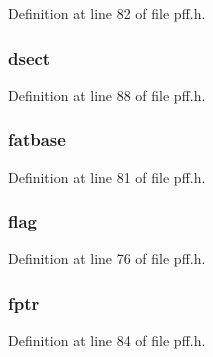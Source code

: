 Definition at line 82 of file pff.\-h.

\hypertarget{struct___f_a_t_f_s___a00baf8b1489c56d34413c3a628cdb9e6}{
\subsubsection[{dsect}]{ dsect}}\label{struct___f_a_t_f_s___a00baf8b1489c56d34413c3a628cdb9e6}


Definition at line 88 of file pff.\-h.

\hypertarget{struct___f_a_t_f_s___a42441439d769eb2ce0d24154c07776c7}{
\subsubsection[{fatbase}]{ fatbase}}\label{struct___f_a_t_f_s___a42441439d769eb2ce0d24154c07776c7}


Definition at line 81 of file pff.\-h.

\hypertarget{struct___f_a_t_f_s___a547483242c245cdd2fcf26c206833980}{
\subsubsection[{flag}]{ flag}}\label{struct___f_a_t_f_s___a547483242c245cdd2fcf26c206833980}


Definition at line 76 of file pff.\-h.

\hypertarget{struct___f_a_t_f_s___a39df2f5f63960289dab619c491c61a63}{
\subsubsection[{fptr}]{ fptr}}\label{struct___f_a_t_f_s___a39df2f5f63960289dab619c491c61a63}


Definition at line 84 of file pff.\-h.

